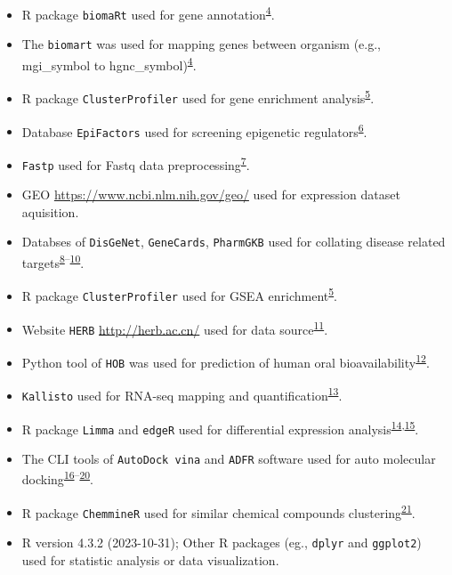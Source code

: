 \documentclass[
]{article}
\providecommand{\tightlist}{%
  \setlength{\itemsep}{0pt}\setlength{\parskip}{0pt}}
\begin{document}
\begin{itemize}
\tightlist
\item
  R package \texttt{biomaRt} used for gene annotation\textsuperscript{\protect\hyperlink{ref-MappingIdentifDurinc2009}{4}}.
\item
  The \texttt{biomart} was used for mapping genes between organism (e.g., mgi\_symbol to hgnc\_symbol)\textsuperscript{\protect\hyperlink{ref-MappingIdentifDurinc2009}{4}}.
\item
  R package \texttt{ClusterProfiler} used for gene enrichment analysis\textsuperscript{\protect\hyperlink{ref-ClusterprofilerWuTi2021}{5}}.
\item
  Database \texttt{EpiFactors} used for screening epigenetic regulators\textsuperscript{\protect\hyperlink{ref-Epifactors2022Maraku2023}{6}}.
\item
  \texttt{Fastp} used for Fastq data preprocessing\textsuperscript{\protect\hyperlink{ref-UltrafastOnePChen2023}{7}}.
\item
  GEO \url{https://www.ncbi.nlm.nih.gov/geo/} used for expression dataset aquisition.
\item
  Databses of \texttt{DisGeNet}, \texttt{GeneCards}, \texttt{PharmGKB} used for collating disease related targets\textsuperscript{\protect\hyperlink{ref-TheDisgenetKnPinero2019}{8}--\protect\hyperlink{ref-PharmgkbAWorBarbar2018}{10}}.
\item
  R package \texttt{ClusterProfiler} used for GSEA enrichment\textsuperscript{\protect\hyperlink{ref-ClusterprofilerWuTi2021}{5}}.
\item
  Website \texttt{HERB} \url{http://herb.ac.cn/} used for data source\textsuperscript{\protect\hyperlink{ref-HerbAHighThFang2021}{11}}.
\item
  Python tool of \texttt{HOB} was used for prediction of human oral bioavailability\textsuperscript{\protect\hyperlink{ref-HobpreAccuratWeiM2022}{12}}.
\item
  \texttt{Kallisto} used for RNA-seq mapping and quantification\textsuperscript{\protect\hyperlink{ref-NearOptimalPrBray2016}{13}}.
\item
  R package \texttt{Limma} and \texttt{edgeR} used for differential expression analysis\textsuperscript{\protect\hyperlink{ref-LimmaPowersDiRitchi2015}{14},\protect\hyperlink{ref-EdgerDifferenChen}{15}}.
\item
  The CLI tools of \texttt{AutoDock\ vina} and \texttt{ADFR} software used for auto molecular docking\textsuperscript{\protect\hyperlink{ref-AutodockVina1Eberha2021}{16}--\protect\hyperlink{ref-AutodockfrAdvRavind2015}{20}}.
\item
  R package \texttt{ChemmineR} used for similar chemical compounds clustering\textsuperscript{\protect\hyperlink{ref-ChemminerACoCaoY2008}{21}}.
\item
  R version 4.3.2 (2023-10-31); Other R packages (eg., \texttt{dplyr} and \texttt{ggplot2}) used for statistic analysis or data visualization.
\end{itemize}
\end{document}
